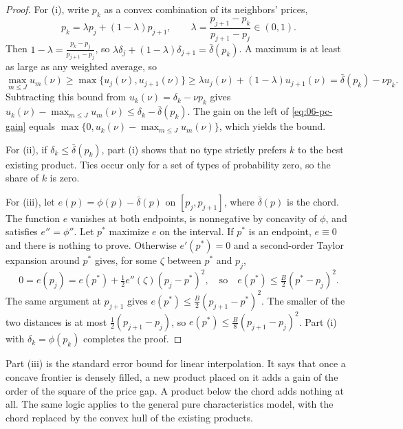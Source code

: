 \begin{proof}
For (i), write $p_k$ as a convex combination of its neighbors' prices,
\begin{equation*}
  p_k = \lambda p_j + (1 - \lambda) p_{j+1}, \qquad \lambda = \frac{p_{j+1} - p_k}{p_{j+1} - p_j} \in (0, 1).
\end{equation*}
Then $1 - \lambda = \frac{p_k - p_j}{p_{j+1} - p_j}$, so $\lambda \delta_j + (1 - \lambda)\delta_{j+1} = \bar\delta(p_k)$.
A maximum is at least as large as any weighted average, so
\begin{equation*}
  \max_{m \le J} u_m(\nu) \ge \max\{u_j(\nu), u_{j+1}(\nu)\}
  \ge \lambda u_j(\nu) + (1 - \lambda) u_{j+1}(\nu)
  = \bar\delta(p_k) - \nu p_k .
\end{equation*}
Subtracting this bound from $u_k(\nu) = \delta_k - \nu p_k$ gives $u_k(\nu) - \max_{m \le J} u_m(\nu) \le \delta_k -
\bar\delta(p_k)$. The gain on the left of \eqref{eq:06-pc-gain} equals $\max\{0, u_k(\nu) - \max_{m \le J} u_m(\nu)\}$,
which yields the bound.

For (ii), if $\delta_k \le \bar\delta(p_k)$, part (i) shows that no type strictly prefers $k$ to the best existing
product. Ties occur only for a set of types of probability zero, so the share of $k$ is zero.

For (iii), let $e(p) = \phi(p) - \bar\delta(p)$ on $[p_j, p_{j+1}]$, where $\bar\delta(p)$ is the chord. The function
$e$ vanishes at both endpoints, is nonnegative by concavity of $\phi$, and satisfies $e'' = \phi''$. Let $p^*$ maximize
$e$ on the interval. If $p^*$ is an endpoint, $e \equiv 0$ and there is nothing to prove. Otherwise $e'(p^*) = 0$ and a
second-order Taylor expansion around $p^*$ gives, for some $\zeta$ between $p^*$ and $p_j$,
\begin{equation*}
  0 = e(p_j) = e(p^*) + \tfrac{1}{2} e''(\zeta)(p_j - p^*)^2 ,
  \quad\text{so}\quad e(p^*) \le \tfrac{B}{2}(p^* - p_j)^2 .
\end{equation*}
The same argument at $p_{j+1}$ gives $e(p^*) \le \frac{B}{2}(p_{j+1} - p^*)^2$. The smaller of the two distances is at
most $\frac{1}{2}(p_{j+1} - p_j)$, so $e(p^*) \le \frac{B}{8}(p_{j+1} - p_j)^2$. Part (i) with $\delta_k = \phi(p_k)$
completes the proof.
\end{proof}

Part (iii) is the standard error bound for linear interpolation. It says that once a concave frontier is densely
filled, a new product placed on it adds a gain of the order of the square of the price gap. A product below the chord
adds nothing at all. The same logic applies to the general pure characteristics model, with the chord replaced by the
convex hull of the existing products.

